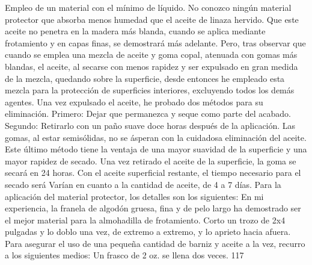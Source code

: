 Empleo de un material con el mínimo de líquido. No conozco ningún material protector que absorba menos humedad que el aceite de linaza hervido. Que este aceite no penetra en la madera más blanda, cuando se aplica mediante frotamiento y en capas finas, se demostrará más adelante. Pero, tras observar que cuando se emplea una mezcla de aceite y goma copal, atenuada con gomas más blandas, el aceite, al secarse con menos rapidez y ser expulsado en gran medida de la mezcla, quedando sobre la superficie, desde entonces he empleado esta mezcla para la protección de superficies interiores, excluyendo todos los demás agentes. Una vez expulsado el aceite, he probado dos métodos para su eliminación. Primero: Dejar que permanezca y seque como parte del acabado. Segundo: Retirarlo con un paño suave doce horas después de la aplicación. Las gomas, al estar semisólidas, no se ásperan con la cuidadosa eliminación del aceite. Este último método tiene la ventaja de una mayor suavidad de la superficie y una mayor rapidez de secado. Una vez retirado el aceite de la superficie, la goma se secará en 24 horas. Con el aceite superficial restante, el tiempo necesario para el secado será
Varían en cuanto a la cantidad de aceite, de 4 a 7 días.
Para la aplicación del material protector, los detalles son los siguientes: En mi experiencia, la franela de algodón gruesa, fina y de pelo largo ha demostrado ser el mejor material para la almohadilla de frotamiento. Corto un trozo de 2x4 pulgadas y lo doblo una vez, de extremo a extremo, y lo aprieto hacia afuera. Para asegurar el uso de una pequeña cantidad de barniz y aceite a la vez, recurro a los siguientes medios: Un frasco de 2 oz. se llena dos veces.
117

